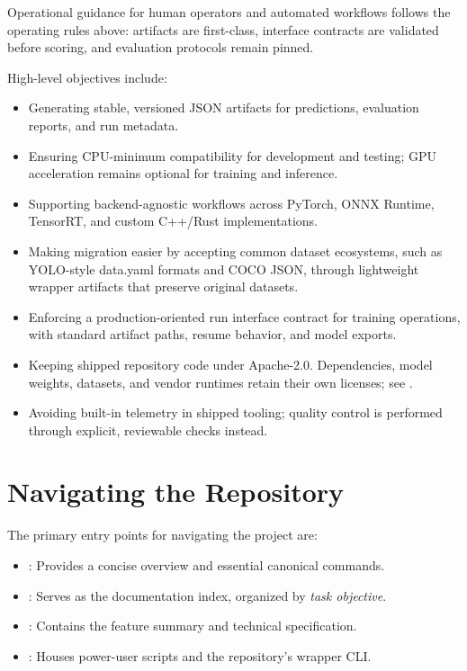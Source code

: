 Operational guidance for human operators and automated workflows follows the operating rules above: artifacts are first-class, interface contracts are validated before scoring, and evaluation protocols remain pinned.

High-level objectives include:
\begin{itemize}
  \item Generating stable, versioned JSON artifacts for predictions, evaluation reports, and run metadata.
  \item Ensuring CPU-minimum compatibility for development and testing; GPU acceleration remains optional for training and inference.
  \item Supporting backend-agnostic workflows across PyTorch, ONNX Runtime, TensorRT, and custom C++/Rust implementations.
  \item Making migration easier by accepting common dataset ecosystems, such as YOLO-style data.yaml formats and COCO JSON, through lightweight wrapper artifacts that preserve original datasets.
  \item Enforcing a production-oriented run interface contract for training operations, with standard artifact paths, resume behavior, and model exports.
  \item Keeping shipped repository code under Apache-2.0. Dependencies, model weights, datasets, and vendor runtimes retain their own licenses; see .
  \item Avoiding built-in telemetry in shipped tooling; quality control is performed through explicit, reviewable checks instead.
\end{itemize}


\section{Navigating the Repository}
The primary entry points for navigating the project are:
\begin{itemize}
  \item {}: Provides a concise overview and essential canonical commands.
  \item {}: Serves as the documentation index, organized by \textit{task objective}.
  \item {}: Contains the feature summary and technical specification.
  \item {}: Houses power-user scripts and the repository's wrapper CLI.
\end{itemize}

